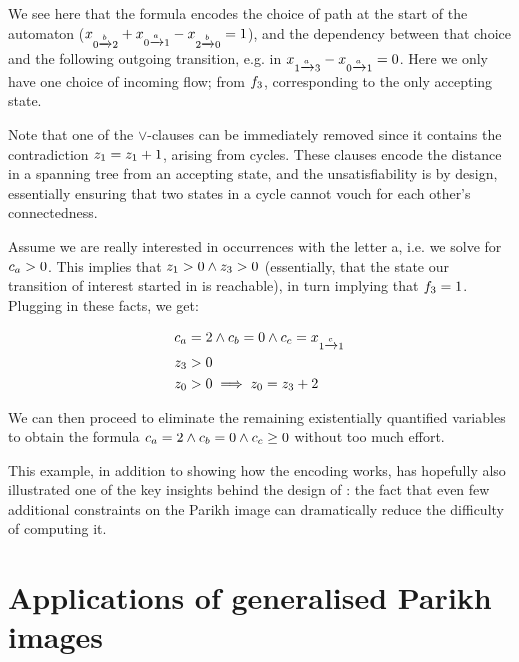 \documentclass[acmsmall,review,anonymous,screen]{acmart}\settopmatter{printfolios=true,printccs=false,printacmref=true}
\theoremstyle{definition}
\begin{document}
  We see here that the formula encodes the choice of path at the start of the
  automaton ($x_{0 \xrightarrow{b} 2} +
  x_{0 \xrightarrow{a} 1} -
  x_{2 \xrightarrow{b} 0} = 1$), and the dependency between that
  choice and the following outgoing transition, e.g. in
  $x_{1 \xrightarrow{a} 3} -
  x_{0 \xrightarrow{a} 1} = 0$. Here we only have one choice of
  incoming flow; from $f_3$, corresponding to the only accepting
  state.


Note that one of the $\lor$-clauses can be immediately removed since it
contains the contradiction $z_{1} = z_{1} + 1$, arising from
cycles. These clauses encode the distance in a spanning tree from an accepting
state, and the unsatisfiability is by design, essentially ensuring that two
states in a cycle cannot vouch for each other's connectedness.

Assume we are really interested in occurrences with the letter a, i.e. we solve
for $c_a > 0$. This implies that $z_{1} > 0 \land z_{3}
> 0$ (essentially, that the state our transition of interest started in is
reachable), in turn implying that $f_3 = 1$. Plugging in these
facts, we get:

\begin{equation}
  \begin{aligned}
  &c_{a} = 2 \land c_{b} = 0 \land c_{c} = x_{1 \xrightarrow{c} 1}\\
  & z_{3} > 0\\
  &z_{0} > 0 \implies z_{0} = z_{3} + 2\\
  \end{aligned}
  \label{eq:parikh-formula-calc}
  \end{equation}

We can then proceed to eliminate the remaining existentially quantified
variables to obtain the formula $c_{a} = 2 \land c_{b} = 0
\land c_{c} \geq 0$ without too much effort.

  This example, in addition to showing how the encoding works, has hopefully
  also illustrated one of the key insights behind the design of \Calculus: the
  fact that even few additional constraints on the Parikh image can dramatically
  reduce the difficulty of computing it.

\section{Applications of generalised Parikh images}\label{sec:applications}
\end{document}
